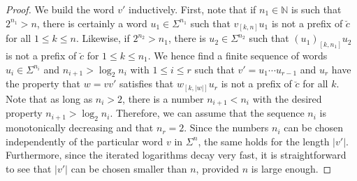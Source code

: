 \documentclass[11pt,reqno]{amsart}
\theoremstyle{plain}
\theoremstyle{definition}
\newcommand{\N}{{\mathbb N}}
\begin{document}
\begin{proof}
We build the word $v'$ inductively. First, note that if $n_1 \in \N$ is such that $2^{n_1} > n$, there is certainly a word $u_1 \in \Sigma^{n_1}$ such that $v_{[k,n]} u_1$ is not a prefix of $\breve{c}$ for all $1\leqslant k \leqslant n$. Likewise, if $2^{n_2} > n_1$, there is $u_2 \in \Sigma^{n_2}$ such that $(u_1)_{[k,n_1]} u_2$ is not a prefix of $\breve{c}$ for $1\leqslant k \leqslant n_1$. We hence find a finite sequence of words $u_i \in \Sigma^{n_i}$ and $n_{i+1} > \log_2 n_i$ with $1\leqslant i \leqslant r$ such that $v' = u_1 \cdots u_{r-1}$ and $u_r$ have the property that $w= vv'$ satisfies that $w_{[k,|w|]} u_r$ is not a prefix of $\breve{c}$ for all $k$. Note that as long as $n_i > 2$, there is a number $n_{i+1} < n_i$ with the desired property $n_{i+1} > \log_2 n_i$. Therefore, we can assume that the sequence $n_i$ is monotonically decreasing and that $n_r = 2$. 
Since the numbers $n_i$ can be chosen independently of the particular word $v$ in $\Sigma^n$, the same holds for the length $|v'|$.
Furthermore, since the iterated logarithms decay very fast, it is straightforward to see that $|v'|$ can be chosen smaller than $n$, provided $n$ is large enough. 
\end{proof}
\end{document}
